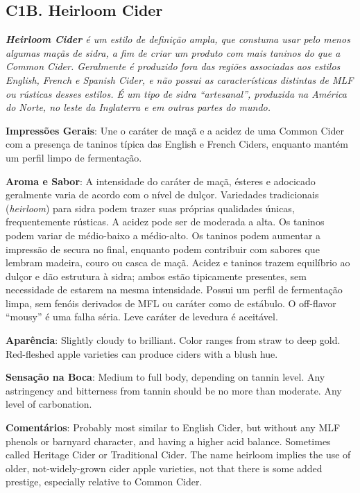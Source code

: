 \subsection*{C1B. Heirloom Cider}

\textit{\textbf{Heirloom Cider} é um estilo de definição ampla, que constuma usar pelo menos algumas maçãs de sidra, a fim de criar um produto com mais taninos do que a Common Cider. Geralmente é produzido fora das regiões associadas aos estilos English, French e Spanish Cider, e não possui as características distintas de MLF ou rústicas desses estilos. É um tipo de sidra “artesanal”, produzida na América do Norte, no leste da Inglaterra e em outras partes do mundo.}

\textbf{Impressões Gerais}: Une o caráter de maçã e a acidez de uma Common Cider com a presença de taninos típica das English e French Ciders, enquanto mantém um perfil limpo de fermentação.

\textbf{Aroma e Sabor}: A intensidade do caráter de maçã, ésteres e adocicado geralmente varia de acordo com o nível de dulçor. Variedades tradicionais (\textit{heirloom}) para sidra podem trazer suas próprias qualidades únicas, frequentemente rústicas. A acidez pode ser de moderada a alta. Os taninos podem variar de médio-baixo a médio-alto. Os taninos podem aumentar a impressão de secura no final, enquanto podem contribuir com sabores que lembram madeira, couro ou casca de maçã. Acidez e taninos trazem equilíbrio ao dulçor e dão estrutura à sidra; ambos estão tipicamente presentes, sem necessidade de estarem na mesma intensidade. Possui um perfil de fermentação limpa, sem fenóis derivados de MFL ou caráter como de estábulo. O off-flavor “mousy” é uma falha séria. Leve caráter de levedura é aceitável.

\textbf{Aparência}: Slightly cloudy to brilliant. Color ranges from straw to deep gold. Red-fleshed apple varieties can produce ciders with a blush hue.

\textbf{Sensação na Boca}: Medium to full body, depending on tannin level. Any astringency and bitterness from tannin should be no more than moderate. Any level of carbonation.

\textbf{Comentários}: Probably most similar to English Cider, but without any MLF phenols or barnyard character, and having a higher acid balance. Sometimes called Heritage Cider or Traditional Cider. The name heirloom implies the use of older, not-widely-grown cider apple varieties, not that there is some added prestige, especially relative to Common Cider.

